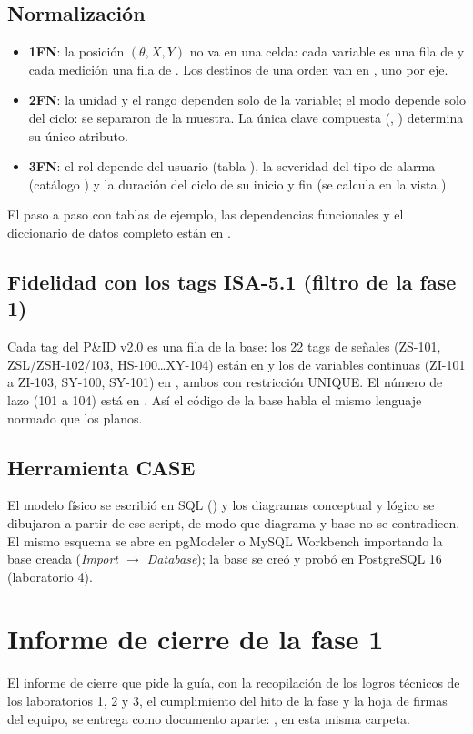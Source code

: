 \documentclass[a4paper,11pt]{article}
\begin{document}
\subsection{Normalización}
\begin{itemize}
\item \textbf{1FN}: la posición $(\theta, X, Y)$ no va en una celda: cada variable es una fila de  y cada medición una fila de . Los destinos de una orden van en , uno por eje.
\item \textbf{2FN}: la unidad y el rango dependen solo de la variable; el modo depende solo del ciclo: se separaron de la muestra. La única clave compuesta (, ) determina su único atributo.
\item \textbf{3FN}: el rol depende del usuario (tabla ), la severidad del tipo de alarma (catálogo ) y la duración del ciclo de su inicio y fin (se calcula en la vista ).
\end{itemize}
El paso a paso con tablas de ejemplo, las dependencias funcionales y el diccionario de datos completo están en .

\subsection{Fidelidad con los tags ISA-5.1 (filtro de la fase 1)}
Cada tag del P\&ID v2.0 es una fila de la base: los 22 tags de señales (ZS-101, ZSL/ZSH-102/103, HS-100\dots XY-104) están en  y los de variables continuas (ZI-101 a ZI-103, SY-100, SY-101) en , ambos con restricción UNIQUE. El número de lazo (101 a 104) está en . Así el código de la base habla el mismo lenguaje normado que los planos.

\subsection{Herramienta CASE}
El modelo físico se escribió en SQL () y los diagramas conceptual y lógico se dibujaron a partir de ese script, de modo que diagrama y base no se contradicen. El mismo esquema se abre en pgModeler o MySQL Workbench importando la base creada (\emph{Import $\to$ Database}); la base se creó y probó en PostgreSQL 16 (laboratorio 4).

\section{Informe de cierre de la fase 1}
El informe de cierre que pide la guía, con la recopilación de los logros técnicos de los laboratorios 1, 2 y 3, el cumplimiento del hito de la fase y la hoja de firmas del equipo, se entrega como documento aparte: , en esta misma carpeta.
\end{document}
